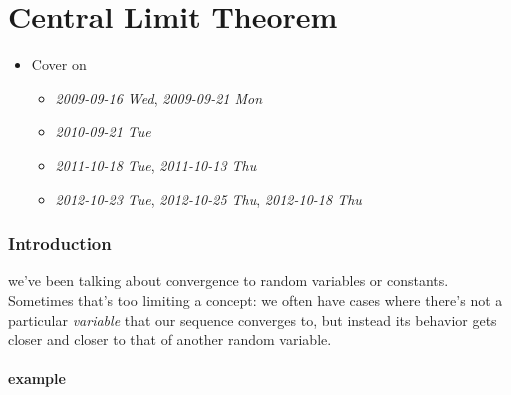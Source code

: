 
\part*{Central Limit Theorem}%

\begin{itemize}
\item Cover on
\begin{itemize}
\item \textit{2009-09-16 Wed}, \textit{2009-09-21 Mon}
\item \textit{2010-09-21 Tue}
\item \textit{2011-10-18 Tue}, \textit{2011-10-13 Thu}
\item \textit{2012-10-23 Tue}, \textit{2012-10-25 Thu}, \textit{2012-10-18 Thu}
\end{itemize}
\end{itemize}
\section{Introduction}
\label{sec-1}

    we've been talking about convergence to random variables or
    constants.  Sometimes that's too limiting a concept: we often have
    cases where there's not a particular \emph{variable} that our sequence
    converges to, but instead its behavior gets closer and closer to
    that of another random variable.  
\subsection{example}
\label{sec-1-1}

